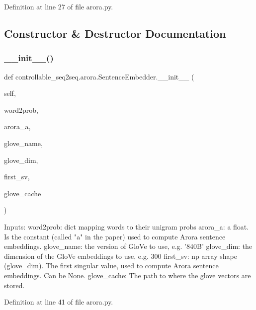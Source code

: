 Definition at line 27 of file arora.\+py.



\subsection{Constructor \& Destructor Documentation}
\mbox{\label{classcontrollable__seq2seq_1_1arora_1_1SentenceEmbedder_adc37598b87a8271ee9c28f4f29d2111e}} 
\subsubsection{\texorpdfstring{\+\_\+\+\_\+init\+\_\+\+\_\+()}{\_\_init\_\_()}}
{\footnotesize\ttfamily def controllable\+\_\+seq2seq.\+arora.\+Sentence\+Embedder.\+\_\+\+\_\+init\+\_\+\+\_\+ (\begin{DoxyParamCaption}\item[{}]{self,  }\item[{}]{word2prob,  }\item[{}]{arora\+\_\+a,  }\item[{}]{glove\+\_\+name,  }\item[{}]{glove\+\_\+dim,  }\item[{}]{first\+\_\+sv,  }\item[{}]{glove\+\_\+cache }\end{DoxyParamCaption})}

\begin{DoxyVerb}  Inputs:
    word2prob: dict mapping words to their unigram probs
    arora_a: a float. Is the constant (called "a" in the paper)
      used to compute Arora sentence embeddings.
    glove_name: the version of GloVe to use, e.g. '840B'
    glove_dim: the dimension of the GloVe embeddings to use, e.g. 300
    first_sv: np array shape (glove_dim). The first singular value,
      used to compute Arora sentence embeddings. Can be None.
    glove_cache: The path to where the glove vectors are stored.
\end{DoxyVerb}
 

Definition at line 41 of file arora.\+py.




